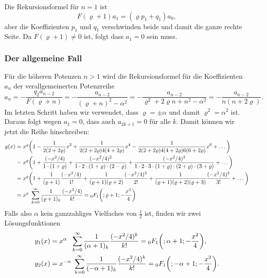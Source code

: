 Die Rekursionsformel für $n=1$ ist
\[
F(\varrho+1) a_1 = (\varrho p_1+q_1)a_0,
\]
aber die Koeffizienten $p_1$ und $q_1$ verschwinden beide und damit
die ganze rechte Seite.
Da $F(\varrho+1)\ne 0$ ist, folgt dass $a_1=0$ sein muss.


\subsubsection{Der allgemeine Fall}
Für die höheren Potenzen $n>1$ wird die Rekursionsformel für die
Koeffizienten $a_n$ der verallgemeinerten Potenzreihe
\[
a_{n} =
-\frac{ q_2 a_{n-2} }{F(\varrho+n)}
=
-\frac{a_{n-2}}{(\varrho+n)^2-\alpha^2}
=
-\frac{a_{n-2}}{\varrho^2 + 2\varrho n+n^2-\alpha^2}
=
-\frac{a_{n-2}}{n(n+2\varrho)}.
\]
Im letzten Schritt haben wir verwendet, dass $\varrho=\pm\alpha$
und damit $\varrho^2=\alpha^2$ ist.
Daraus folgt wegen $a_1=0$, dass auch $a_{2k+1}=0$ für alle $k$.
Damit können wir jetzt die Reihe hinschreiben:
\begin{align*}
y(x)
&=
x^{\varrho}\biggl(
1
-
\frac{1}{2(2+2\varrho)} x^2
+
\frac{1}{2(2+2\varrho)4(4+2\varrho)} x^4
-
\frac{1}{2(2+2\varrho)4(4+2\varrho)6(6+2\varrho)} x^6
+
\dots
\biggr)
\\
&=
x^{\varrho}
\biggl(
1
+
\frac{(-x^2/4)}{1\cdot (1+\varrho)}
+
\frac{(-x^2/4)^2}{1\cdot 2\cdot (1+\varrho)\cdot(2-\varrho)}
+
\frac{(-x^2/4)^3}{1\cdot 2\cdot 3\cdot (1+\varrho)\cdot(2+\varrho)\cdot(3+\varrho)}
+
\dots
\biggr)
\\
&=
x^\varrho\biggl(
1
+
\frac{1}{(\varrho+1)}\frac{(-x^2/4)}{1!}
+
\frac{1}{(\varrho+1)(\varrho+2)}\frac{(-x^2/4)^2}{2!}
+
\frac{1}{(\varrho+1)(\varrho+2)(\varrho+3)}\frac{(-x^2/4)^3}{3!}
+
\dots
\biggr)
\\
&=
x^\varrho \sum_{k=0}^\infty
\frac{1}{(\varrho+1)_k} \frac{(-x^2/4)}{k!}
=
\mathstrut_0F_1\biggl(;\varrho+1;-\frac{x^2}{4}\biggr)
\end{align*}
Falls also $\alpha$ kein ganzzahliges Vielfaches von $\frac12$ ist, finden
wir zwei Lösungsfunktionen
\begin{align}
y_1(x)
&=
x^{\alpha\phantom{-}}
\sum_{k=0}^\infty
\frac{1}{(\alpha+1)_k}
\frac{(-x^2/4)^k}{k!}
=
\mathstrut_0F_1\biggl(;\alpha+1;-\frac{x^2}{4}\biggr),
\label{buch:differentialgleichunge:bessel:erste}
\\
y_2(x)
&=
x^{-\alpha} \sum_{k=0}^\infty
\frac{1}{(-\alpha+1)_k} \frac{(-x^2/4)^k}{k!}
=
\mathstrut_0F_1\biggl(;-\alpha+1;-\frac{x^2}{4}\biggr).
\label{buch:differentialgleichunge:bessel:zweite}
\end{align}

